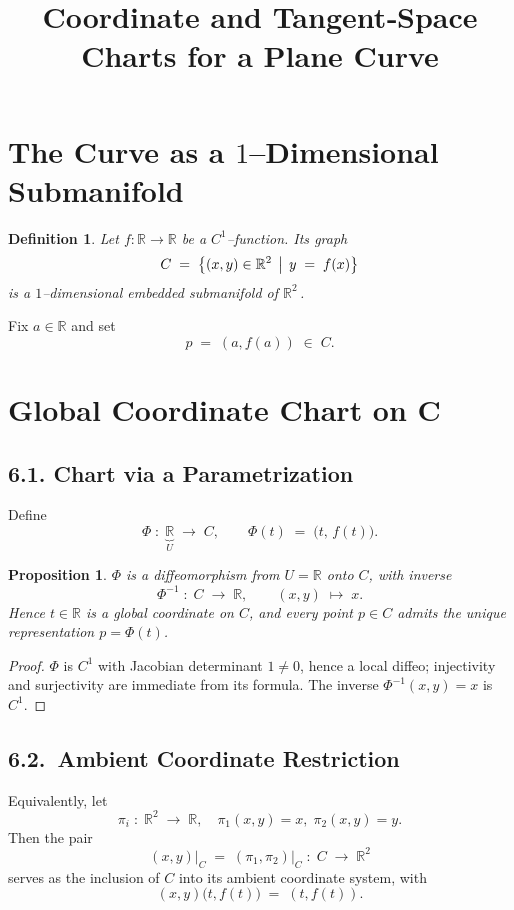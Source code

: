 \documentclass[12pt]{article}
\title{Coordinate and Tangent‐Space Charts for a Plane Curve}
\author{}
\date{}
\numberwithin{equation}{section}
\newtheorem{proposition}[theorem]{Proposition} %
\theoremstyle{definitionstyle}
\newtheorem{definition}{Definition} %
\newcommand{\R}{\mathbb{R}}
\begin{document}
	\maketitle
	
	\section{The Curve as a $1$–Dimensional Submanifold}
	
	\begin{definition}
		Let $f\colon \R \to \R$ be a $C^1$–function.  Its \emph{graph}
		\[
		C \;=\;\bigl\{(x,y)\in\R^2 \,\bigm|\, y \;=\; f(x)\bigr\}
		\]
		is a $1$–dimensional embedded submanifold of $\R^2\,$.
	\end{definition}
	
	\noindent Fix $a\in\R$ and set 
	\[
	p \;=\;(a,f(a)) \;\in\; C.
	\]
	
	\section{Global Coordinate Chart on \(\mathbf{C}\)}
	
	\subsection*{6.1. Chart via a Parametrization}
	
	Define
	\[
	\Phi\;:\;\underbrace{\R}_{\displaystyle U}\;\longrightarrow\;C,
	\qquad
	\Phi(t)\;=\;\bigl(t,\,f(t)\bigr).
	\]
	\begin{proposition}
		$\Phi$ is a diffeomorphism from $U=\R$ onto $C$, with inverse
		\[
		\Phi^{-1}\;:\;C\;\longrightarrow\;\R,
		\qquad
		(x,y)\;\longmapsto\;x.
		\]
		Hence $t\in\R$ is a global coordinate on $C$, and every point $p\in C$ admits the unique representation $p=\Phi(t)$.
	\end{proposition}
	
	\begin{proof}
		$\Phi$ is $C^1$ with Jacobian determinant $1\neq0$, hence a local diffeo; injectivity and surjectivity are immediate from its formula.  The inverse $\Phi^{-1}(x,y)=x$ is $C^1$.
	\end{proof}
	
	\subsection*{6.2.\ Ambient Coordinate Restriction}
	
	Equivalently, let
	\[
	\pi_i\;:\;\R^2\;\longrightarrow\;\R,\quad
	\pi_1(x,y)=x,\;\pi_2(x,y)=y.
	\]
	Then the pair
	\[
	(x,y)\bigl|_C
	\;=\;
	(\pi_1,\pi_2)\bigl|_C
	\;:\;
	C
	\;\longrightarrow\;
	\R^2
	\]
	serves as the inclusion of $C$ into its ambient coordinate system, with
	\[
	(x,y)\bigl(t,f(t)\bigr)\;=\;(t,f(t)).
	\]
	
\end{document}

